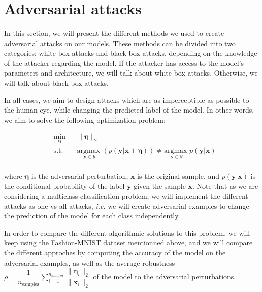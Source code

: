 \documentclass[11pt,twocolumn,letterpaper]{article}
\begin{document}
\section{Adversarial attacks}
\label{sec:attacks}

\paragraph{} In this section, we will present the different methods we used to create adversarial attacks on our models. These methods can be divided into two categories: white box attacks and black box attacks, depending on the knowledge of the attacker regarding the model. If the attacker has access to the model's parameters and architecture, we will talk about white box attacks. Otherwise, we will talk about black box attacks. 

In all cases, we aim to design attacks which are as imperceptible as possible to the human eye, while changing the predicted label of the model. In other words, we aim to solve the following optimization problem:

\begin{equation*}
\begin{aligned}
& \underset{\bm{\eta}}{\text{min}}
& & \|\bm{\eta}\|_2 \\
& \text{s.t.} 
& & \underset{\bm{y} \in \mathcal{Y}}{\text{argmax }}(p(\bm{y}|\bm{x} + \bm{\eta})) \neq \underset{\bm{y} \in \mathcal{Y}}{\text{argmax }}p(\bm{y}|\bm{x}) \\
\end{aligned}
\end{equation*}

where $\bm{\eta}$ is the adversarial perturbation, $\bm{x}$ is the original sample, and $p(\bm{y}|\bm{x})$ is the conditional probability of the label $\bm{y}$ given the sample $\bm{x}$. Note that as we are considering a multiclass classification problem, we will implement the different attacks as one-vs-all attacks, \textit{i.e.} we will create adversarial examples to change the prediction of the model for each class independently.

In order to compare the different algorithmic solutions to this problem, we will keep using the Fashion-MNIST dataset mentionned above, and we will compare the different approches by computing the accuracy of the model on the adversarial examples, as well as the average robustness $\rho = \displaystyle \dfrac{1}{n_{\text{samples}}} \sum \limits_{i=1}^{n_{\text{samples}}} \dfrac{\|\bm{\eta}_i \|_2}{\|\bm{x}_i\|_2}$ of the model to the adversarial perturbations.
\end{document}
